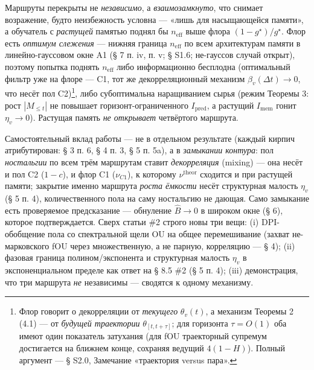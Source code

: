 \documentclass[12pt]{iopart}
\begin{document}
Маршруты перекрыты не \emph{независимо}, а \emph{взаимозамкнуто}, что снимает возражение, будто неизбежность условна --- «лишь для насыщающейся памяти», а обучатель с \emph{растущей} памятью поднял бы \(n_{\text{eff}}\) выше флора \((1-g^\star)/g^\star\). Флор есть \emph{оптимум слежения} --- нижняя граница \(n_{\text{eff}}\) по всем архитектурам памяти в линейно-гауссовом окне A1 (§ 7 п. iv, п. v; § S1.6; не-гауссов случай открыт), поэтому попытка поднять \(n_{\text{eff}}\) либо информационно бесплодна (оптимальный фильтр уже на флоре --- C1, тот же декорреляционный механизм \(\beta_v(\Delta t)\to0\), что несёт пол C2)\footnote{Флор говорит о декорреляции от \emph{текущего} \(\theta_v(t)\), а механизм Теоремы 2 (4.1) --- от \emph{будущей траектории} \(\theta_{[t,t+\tau]}\); для горизонта \(\tau = O(1)\) оба имеют один показатель затухания (для fOU траекторный супремум достигается на ближнем конце, сохраняя ведущий \(4(1-H)\)). Полный аргумент --- § S2.0, Замечание «траектория versus пара».}, либо субоптимальна наращиванием сырья (режим Теоремы 3: рост \(|M_{\le t}|\) не повышает горизонт-ограниченного \(I_{\text{pred}}\), а растущий \(I_{\text{mem}}\) гонит \(\eta_v \to 0\)). Растущая память \emph{не открывает} четвёртого маршрута.



Самостоятельный вклад работы --- не в отдельном результате (каждый кирпич атрибутирован: § 3 п. 6, § 4 п. 3, § 5 п. 5a), а в \emph{замыкании контура}: пол \emph{ностальгии} по всем трём маршрутам ставит \emph{декорреляция} (mixing) --- она несёт и пол C2 (\(1-c\)), и флор C1 (\(\nu_{C1}\)), к которому \(\nu^{\text{theor}}\) сходится и при растущей памяти; закрытие именно маршрута \emph{роста ёмкости} несёт структурная малость \(\eta_v\) (§ 5 п. 4), количественного пола на саму ностальгию не дающая. Само замыкание есть проверяемое предсказание --- обнуление \(\hat B \to 0\) в широком окне (§ 6), которое подтверждается. Сверх статьи \#2 строго новы три вещи: (i) DPI-обобщение пола со спектральной щели OU на общее перемешивание (захват не-марковского fOU через множественную, а не парную, корреляцию --- § 4); (ii) фазовая граница полином/экспонента и структурная малость \(\eta_v\) в экспоненциальном пределе как ответ на § 8.5 \#2 \cite{Andriishin2026b} (§ 5 п. 4); (iii) демонстрация, что три маршрута \emph{не} независимы --- сводятся к одному механизму.
\end{document}
